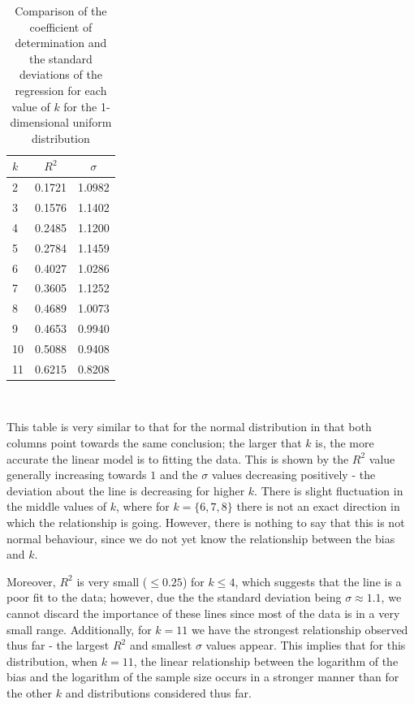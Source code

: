 \documentclass[12pt]{report}
\begin{document}
\begin{table}
\caption{Comparison of the coefficient of determination and the standard deviations of the regression for each value of $k$ for the 1-dimensional uniform distribution} \label{uniform_rsq}
\begin{center}
\begin{tabular}{| l | c c |} 
\toprule
$k$ & $R^2$ & $\sigma$ \\
\midrule[1pt]
2     & 0.1721    & 1.0982   \\
3     & 0.1576    & 1.1402   \\
4     & 0.2485    & 1.1200   \\
5     & 0.2784    & 1.1459   \\
6     & 0.4027    & 1.0286   \\
7     & 0.3605    & 1.1252   \\
8     & 0.4689    & 1.0073   \\
9     & 0.4653    & 0.9940   \\
10    & 0.5088    & 0.9408   \\
11    & 0.6215    & 0.8208   \\
\hline
\end{tabular}
\\[10pt]
\end{center}
\end{table}

This table is very similar to that for the normal distribution in that both columns point towards the same conclusion; the larger that $k$ is, the more accurate the linear model is to fitting the data. This is shown by the $R^2$ value generally increasing towards $1$ and the $\sigma$ values decreasing positively - the deviation about the line is decreasing for higher $k$. There is slight fluctuation in the middle values of $k$, where for $k = \{6, 7, 8\}$ there is not an exact direction in which the relationship is going. However, there is nothing to say that this is not normal behaviour, since we do not yet know the relationship between the bias and $k$.

Moreover, $R^2$ is very small ($\leq 0.25$) for $k \leq 4$, which suggests that the line is a poor fit to the data; however, due the the standard deviation being $\sigma \approx 1.1$, we cannot discard the importance of these lines since most of the data is in a very small range. Additionally, for $k=11$ we have the strongest relationship observed thus far - the largest $R^2$ and smallest $\sigma$ values appear. This implies that for this distribution, when $k=11$, the linear relationship between the logarithm of the bias and the logarithm of the sample size occurs in a stronger manner than for the other $k$ and distributions considered thus far.
\end{document}
